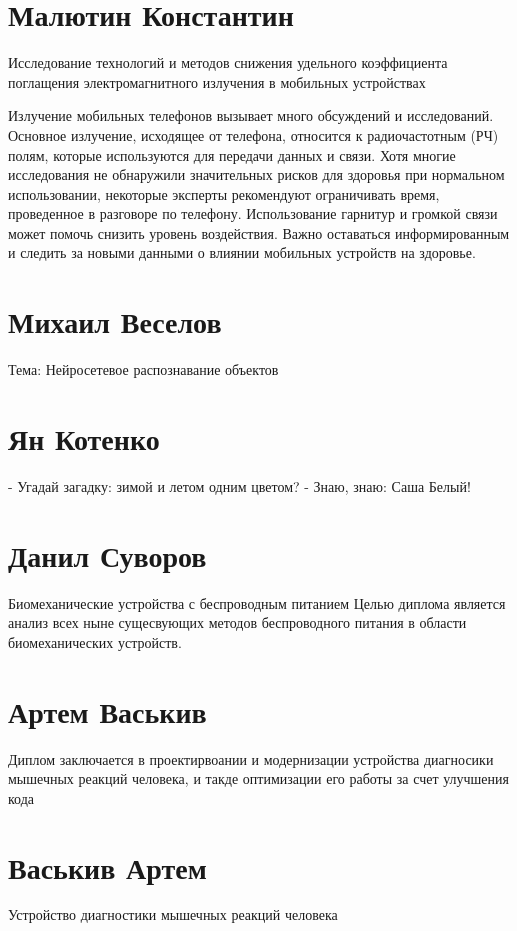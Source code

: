 \documentclass{article}
\begin{document}
\section*{Малютин Константин}
Исследование технологий и методов снижения удельного коэффициента поглащения электромагнитного излучения в мобильных устройствах


Излучение мобильных телефонов вызывает много обсуждений и исследований. Основное излучение, исходящее от телефона, относится к радиочастотным (РЧ) полям, которые используются для передачи данных и связи. Хотя многие исследования не обнаружили значительных рисков для здоровья при нормальном использовании, некоторые эксперты рекомендуют ограничивать время, проведенное в разговоре по телефону. Использование гарнитур и громкой связи может помочь снизить уровень воздействия. Важно оставаться информированным и следить за новыми данными о влиянии мобильных устройств на здоровье.



\section*{Михаил Веселов}
Тема: Нейросетевое распознавание объектов

\section*{Ян Котенко}
- Угадай загадку: зимой и летом одним цветом?
- Знаю, знаю: Саша Белый!

\section*{Данил Суворов}
Биомеханические устройства с беспроводным питанием
Целью диплома является анализ всех ныне сущесвующих методов беспроводного питания в области биомеханических устройств.


\section*{Артем Васькив}

Диплом заключается в проектирвоании и модернизации устройства диагносики мышечных реакций человека, и такде оптимизации его работы за счет улучшения кода
\section*{Васькив Артем}

Устройство диагностики мышечных реакций человека 
\end{document}
